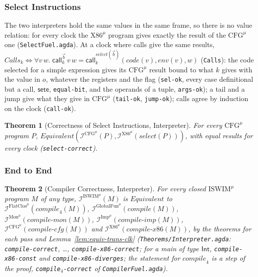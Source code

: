 \documentclass[10pt]{article}
\theoremstyle{acmplain}
\newtheorem{theorem}{Theorem}[section]
\newcommand{\key}[1]{\mathsf{#1}}
\newcommand{\pass}[1]{\mathit{#1}}
\newcommand{\Equiv}{\mathit{Equivalent}}
\newcommand{\CALL}[2]{\key{call}^{#1}_{#2}}
\newcommand{\Interp}[1]{\mathcal{I}^{#1}}
\newcommand{\Ml}[1]{\textrm{#1}^{\mu}}                  %
\begin{document}
\subsubsection{Select Instructions}

The two interpreters hold the same values in the same frame, so there is
no value relation: for every clock the $\Ml{X86}$ program gives exactly the
result of the $\Ml{CFG}$ one (\texttt{SelectFuel.agda}). At a clock where
calls give the same results, $\mathit{Calls}_k \iff \forall v\, w.\;
\CALL{\vec{b}}{k}\,v\,w = \CALL{\pass{select}(\vec{b})}{k}(\mathit{code}(v),
\mathit{env}(v), w)$ (\texttt{Calls}): the code selected for a simple
expression gives its $\Ml{CFG}$ result bound to what $k$ gives with the
value in $o$, whatever the registers and the flag (\texttt{sel-ok}, every
case definitional but a call, $\key{sete}$, \texttt{equal-bit}, and the
operands of a tuple, \texttt{args-ok}); a tail and a jump give what they
give in $\Ml{CFG}$ (\texttt{tail-ok}, \texttt{jump-ok}); calls agree by
induction on the clock (\texttt{call-ok}).
\begin{theorem}[Correctness of Select Instructions, Interpreter]\label{thm:m-interp-select}
For every $\Ml{CFG}$ program $P$,
$\Equiv(\Interp{\Ml{CFG}}(P), \Interp{\Ml{X86}}(\pass{select}(P)))$, with
equal results for every clock (\texttt{select-correct}).
\end{theorem}

\subsubsection{End to End}

\begin{theorem}[Compiler Correctness, Interpreter]\label{thm:m-interp-compiler}
For every closed $\Ml{ISWIM}$ program $M$ of any type, $\Interp{\Ml{ISWIM}}(M)$
is $\Equiv$ to $\Interp{\Ml{FlatClos}}(\pass{compile}_4(M))$,
$\Interp{\Ml{GlobalFun}}(\pass{compile}(M))$, $\Interp{\Ml{Mon}}(\pass{compile\text{-}mon}(M))$,
$\Interp{\Ml{Imp}}(\pass{compile\text{-}imp}(M))$, $\Interp{\Ml{CFG}}(\pass{compile\text{-}cfg}(M))$
and $\Interp{\Ml{X86}}(\pass{compile\text{-}x86}(M))$, by the theorems for each
pass and Lemma~\ref{lem:equiv-trans-clk} (\texttt{Theorems/\allowbreak Interpreter.agda}:
\texttt{compile-correct}, \ldots, \texttt{compile-x86-correct}; for a
main of type $\key{Int}$, \texttt{compile-x86-const} and
\texttt{compile-x86-diverges}; the statement for $\pass{compile}_4$ is a
step of the proof, \texttt{compile$_4$-correct} of
\texttt{CompilerFuel.agda}).
\end{theorem}
\end{document}

